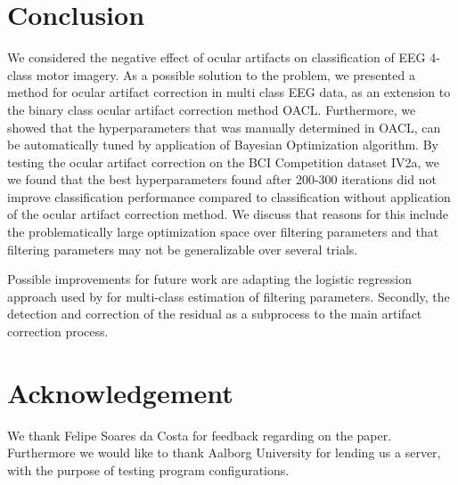 \section{Conclusion}
We considered the negative effect of ocular artifacts on classification of EEG 4-class motor imagery. As a possible solution to the problem, we presented a method for ocular artifact correction in multi class EEG data, as an extension to the binary class ocular artifact correction method OACL\citep{li2015ocular}. Furthermore, we showed that the hyperparameters that was manually determined in OACL, can be automatically tuned by application of Bayesian Optimization algorithm. By testing the ocular artifact correction on the BCI Competition dataset IV2a, we  we found that the best hyperparameters found after 200-300 iterations did not improve classification performance compared to classification without application of the ocular artifact correction method. We discuss that reasons for this include the problematically large optimization space over filtering parameters and that filtering parameters may not be generalizable over several trials.

Possible improvements for future work are adapting the logistic regression approach used by \citep{li2015ocular} for multi-class estimation of filtering parameters. Secondly, the detection and correction of the residual as a subprocess to the main artifact correction process. 

\section{Acknowledgement}
We thank Felipe Soares da Costa for feedback regarding on the paper. Furthermore we would like to thank Aalborg University for lending us a server, with the purpose of testing program configurations.  